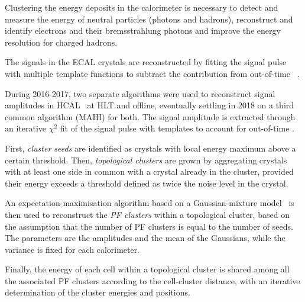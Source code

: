 \label{sec:clusters}
Clustering the energy deposits in the calorimeter is necessary to
detect and measure the energy of neutral particles (photons and hadrons),
reconstruct and identify electrons and their bremsstrahlung photons
and improve the energy resolution for charged hadrons.


The signals in the ECAL crystals are reconstructed by fitting the signal pulse
with multiple template functions to subtract the contribution from out-of-time \pileup~\cite{CMS-EGM-18-001}.

During 2016-2017, two separate algorithms were used
to reconstruct signal amplitudes in HCAL~\cite{CMS-PRF-22-001} at HLT and offline,
eventually settling in 2018 on a third common algorithm (MAHI) for both.
The signal amplitude is extracted through an iterative $\chi^2$ fit of the signal pulse
with templates to account for out-of-time \pileup.

First, \textit{cluster seeds} are identified as crystals with local energy maximum above a certain threshold.
Then, \textit{topological clusters} are grown by aggregating crystals with at least one side in common with a crystal already in the cluster,
provided their energy exceeds a threshold defined as twice the noise level in the crystal.

An expectation-maximisation algorithm based on a Gaussian-mixture model~\cite{CMS-NOTE-2005-001}
is then used to reconstruct the \textit{PF clusters} within a topological cluster,
based on the assumption that the number of PF clusters is equal to the number of seeds.
The parameters are the amplitudes and the mean of the Gaussians, while the variance is fixed for each calorimeter.

Finally, the energy of each cell within a topological cluster is shared among all the associated PF clusters according to the cell-cluster distance,
with an iterative determination of the cluster energies and positions.
